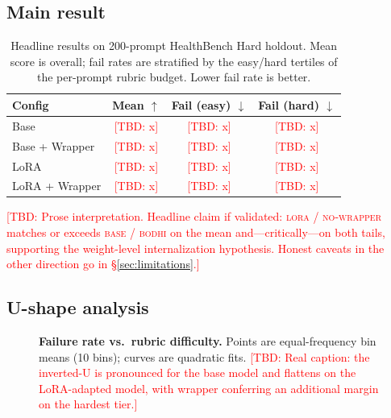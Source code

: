 \documentclass[10pt,letterpaper]{article}
\newcommand{\tbd}[1]{\textcolor{red}{[TBD: #1]}}
\begin{document}
\subsection{Main result}

\begin{table}[t]
  \centering
  \small
  \begin{tabular}{lccc}
    \toprule
    Config & Mean $\uparrow$ & Fail (easy) $\downarrow$ & Fail (hard) $\downarrow$ \\
    \midrule
    Base & \tbd{x} & \tbd{x} & \tbd{x} \\
    Base + Wrapper & \tbd{x} & \tbd{x} & \tbd{x} \\
    LoRA & \tbd{x} & \tbd{x} & \tbd{x} \\
    LoRA + Wrapper & \tbd{x} & \tbd{x} & \tbd{x} \\
    \bottomrule
  \end{tabular}
  \caption{Headline results on 200-prompt HealthBench Hard holdout.
  Mean score is overall; fail rates are stratified by the
  easy/hard tertiles of the per-prompt rubric budget. Lower fail rate
  is better.}
  \label{tab:main}
\end{table}

\tbd{Prose interpretation. Headline claim if validated:
\textsc{lora / no-wrapper} matches or exceeds
\textsc{base / bodhi} on the mean and---critically---on both tails,
supporting the weight-level internalization hypothesis. Honest
caveats in the other direction go in \S\ref{sec:limitations}.}

\subsection{U-shape analysis}

\begin{figure}[t]
  \centering
  \caption{\textbf{Failure rate vs.\ rubric difficulty.} Points are
  equal-frequency bin means (10 bins); curves are quadratic fits.
  \tbd{Real caption: the inverted-U is pronounced for the base
  model and flattens on the LoRA-adapted model, with wrapper conferring
  an additional margin on the hardest tier.}}
  \label{fig:ushape}
\end{figure}
\end{document}
